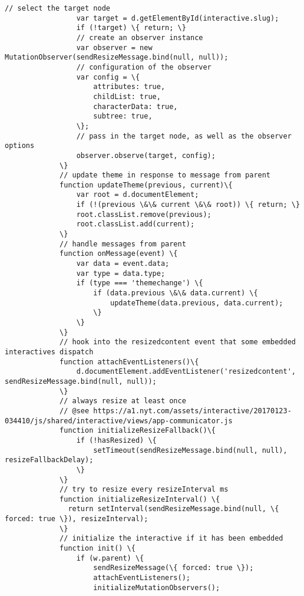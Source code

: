 \documentclass[11pt]{article}
\begin{document}
\begin{Verbatim}[commandchars=\\\{\}]
                 // select the target node
                 var target = d.getElementById(interactive.slug);
                 if (!target) \{ return; \}
                 // create an observer instance
                 var observer = new MutationObserver(sendResizeMessage.bind(null, null));
                 // configuration of the observer
                 var config = \{
                     attributes: true,
                     childList: true,
                     characterData: true,
                     subtree: true,
                 \};
                 // pass in the target node, as well as the observer options
                 observer.observe(target, config);
             \}
             // update theme in response to message from parent
             function updateTheme(previous, current)\{
                 var root = d.documentElement;
                 if (!(previous \&\& current \&\& root)) \{ return; \}
                 root.classList.remove(previous);
                 root.classList.add(current);
             \}
             // handle messages from parent
             function onMessage(event) \{
                 var data = event.data;
                 var type = data.type;
                 if (type === 'themechange') \{
                     if (data.previous \&\& data.current) \{
                         updateTheme(data.previous, data.current);
                     \}
                 \}
             \}
             // hook into the resizedcontent event that some embedded interactives dispatch
             function attachEventListeners()\{
                 d.documentElement.addEventListener('resizedcontent', sendResizeMessage.bind(null, null));
             \}
             // always resize at least once
             // @see https://a1.nyt.com/assets/interactive/20170123-034410/js/shared/interactive/views/app-communicator.js
             function initializeResizeFallback()\{
                 if (!hasResized) \{
                     setTimeout(sendResizeMessage.bind(null, null), resizeFallbackDelay);
                 \}
             \}
             // try to resize every resizeInterval ms
             function initializeResizeInterval() \{
               return setInterval(sendResizeMessage.bind(null, \{ forced: true \}), resizeInterval);
             \}
             // initialize the interactive if it has been embedded
             function init() \{
                 if (w.parent) \{
                     sendResizeMessage(\{ forced: true \});
                     attachEventListeners();
                     initializeMutationObservers();

\end{Verbatim}
\end{document}
